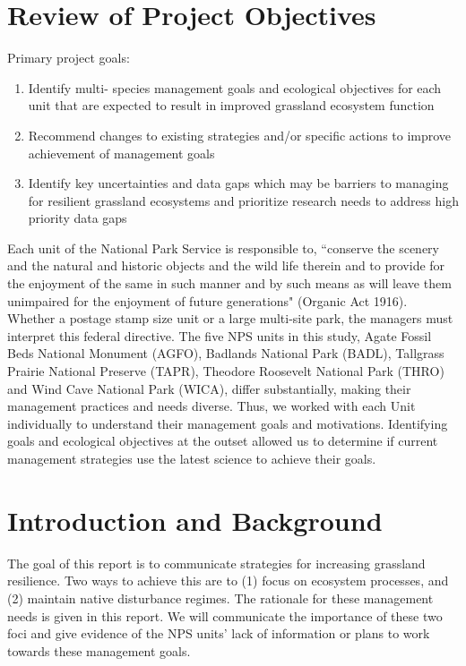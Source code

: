 \hypertarget{review-of-project-objectives-1}{%
	\section{Review of Project Objectives
	}\label{review-of-project-objectives-1}}

Primary project goals:

\begin{enumerate}
	\item Identify multi- species management goals and ecological objectives for each unit that are expected to result in improved grassland ecosystem function
	\item 	Recommend changes to existing strategies and/or specific actions to improve achievement of management goals 
	\item Identify key uncertainties and data gaps which may be barriers to managing for resilient grassland ecosystems and prioritize research needs to address high priority data gaps
\end{enumerate}

Each unit of the National Park Service is responsible to, ``conserve the scenery and the natural and historic objects and the wild life therein and to provide for the enjoyment of the same in such manner and by such means as will leave them unimpaired for the enjoyment of future generations" (Organic Act 1916). 
Whether a postage stamp size unit or a large multi-site park, the managers must interpret this federal directive. 
The five NPS units in this study, Agate Fossil Beds National Monument (AGFO), Badlands National Park (BADL), Tallgrass Prairie National Preserve (TAPR), Theodore Roosevelt National Park (THRO) and Wind Cave National Park (WICA), differ substantially, making their management practices and needs diverse. 
Thus, we worked with each Unit individually to understand their management goals and motivations. 
Identifying goals and ecological objectives at the outset allowed us to determine if current management strategies use the latest science to achieve their goals.


\hypertarget{introduction-and-background-1}{%
	\section{Introduction and Background
	}\label{introduction-and-background-1}}

The goal of this report is to communicate strategies for increasing grassland resilience. Two ways to achieve this are to (1) focus on ecosystem processes, and (2) maintain native disturbance regimes. 
The rationale for these management needs is given in this report. 
We will communicate the importance of these two foci and give evidence of the NPS units' lack of information or plans to work towards these management goals.

